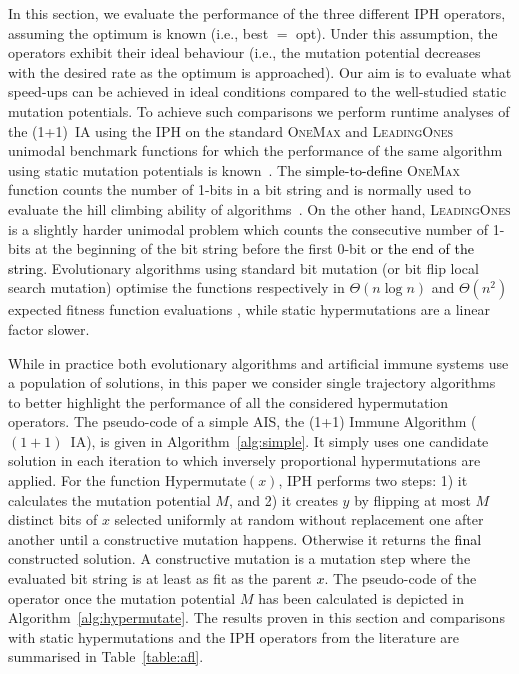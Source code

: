 \documentclass[lettersize,journal]{IEEEtran}
\newcommand{\new}[1]{\textcolor{black}{#1}}
\newcommand{\rev}[1]{\textcolor{black}{#1}}
\newcommand{\rerev}[1]{\textcolor{black}{#1}}
\newcommand{\oneoneIA}{$(1+1)$~IA}
\newcommand{\IPHfcm}{IPH}
\begin{document}
In this section, we evaluate the performance of the three different \IPHfcm{} operators, assuming the optimum is known (i.e., best $=$ opt). Under this assumption, the operators exhibit their ideal behaviour (i.e., the mutation potential decreases with the desired rate as the optimum is approached).
Our aim is to evaluate what speed-ups can be achieved in ideal conditions compared to the well-studied static mutation potentials. To achieve such comparisons we perform runtime analyses of the (1+1)~IA  using the \IPHfcm{} on the standard \textsc{OneMax} and \textsc{LeadingOnes} unimodal benchmark functions for which the performance of the same algorithm using static mutation potentials is known~\cite{CorusOlivetoYazdani2019TCS}. The \rev{simple-to-define} \textsc{OneMax} function counts the number of 1-bits in \new{a} bit string and is normally used to evaluate the hill climbing ability of algorithms~\cite{LehrTEVC2018,CorusOlivetoTEVCsteadyGA2017,CorusOlivetoAlgo2020,DoerrDoerrEbel2015}. On the other hand, \textsc{LeadingOnes} is a slightly harder unimodal problem which counts the consecutive number of 1-bits at the beginning of the bit string before the first 0-bit \rev{or the end of the string}. 
Evolutionary algorithms using standard bit mutation (or bit flip local search mutation) optimise the functions respectively in $\Theta(n \log n)$ and $\Theta(n^2)$ expected fitness function evaluations \cite{DrosteJansenWegener2002,BoettcherEtAl2010,DoerrEtAl2016B,LissovoiOlivetoWarwicker2020,DLOW2018}, while static hypermutations are a linear factor slower\cite{CorusOlivetoYazdani2019TCS}.

While in practice both evolutionary algorithms and artificial immune systems use a population of solutions, in this paper we consider single trajectory algorithms to better highlight the performance of all the considered hypermutation operators.
The pseudo-code of a simple AIS,  the (1+1) Immune Algorithm (\oneoneIA{}), is given in Algorithm~\ref{alg:simple}. It simply uses one candidate solution in each iteration to which inversely proportional hypermutations are applied. For the function Hypermutate$(x)$, \IPHfcm{} performs two steps: 
1) it calculates the mutation potential $M$, and 2) it creates $y$ by flipping at most $M$ distinct bits of $x$ selected uniformly at random without replacement one after another until a constructive mutation happens. Otherwise it returns the \rerev{final} constructed solution. A  constructive mutation is a mutation step where the evaluated bit string is at least as fit as the parent \new{$x$}. The pseudo-code of the operator once the mutation potential $M$ has been calculated is depicted in Algorithm~\ref{alg:hypermutate}.
The results proven in this section and comparisons with static hypermutations and the IPH operators from the literature are summarised in Table~\ref{table:afl}.
\end{document}
